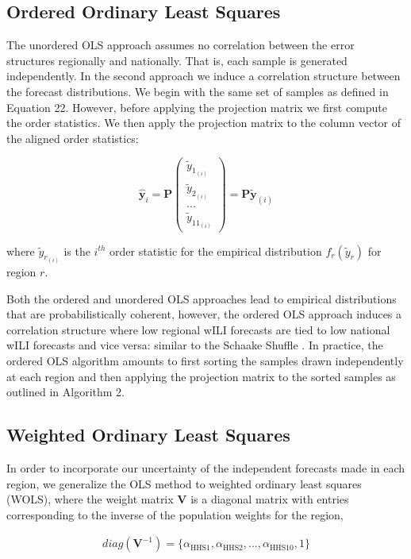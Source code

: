 \documentclass{umassthesis}          %
\begin{document}
\subsection{Ordered Ordinary Least Squares}

The unordered OLS approach assumes no correlation between the error structures regionally and nationally. That is, each sample is generated independently. In the second approach we induce a correlation structure between the forecast distributions. We begin with the same set of samples as defined in Equation 22. However, before applying the projection matrix we first compute the order statistics.  We then apply the projection matrix to the column vector of the aligned order statistics:

$$\bm{\hat{y}}_{i}=\bm{P} \begin{pmatrix} \tilde{y}_{1_{(i)}} \\  \tilde{y}_{2_{(i)}} \\ ... \\  \tilde{y}_{11_{(i)}} \end{pmatrix} = \bm{P} \bm{\tilde{y}}_{(i)}$$

\noindent where $\tilde{y}_{r_{(i)}} $ is the $i^{th}$ order statistic for the empirical distribution $f_r(\tilde{y}_{r})$ for region $r$.

Both the ordered and unordered OLS approaches lead to empirical distributions that are probabilistically coherent, however, the ordered OLS approach induces a correlation structure where low regional wILI forecasts  are tied to low national wILI forecasts and vice versa: similar to the Schaake Shuffle \cite{scheffe}. In practice, the ordered OLS algorithm amounts to first sorting the samples drawn independently at each region and then applying the projection matrix to the sorted samples as outlined in Algorithm 2.



\subsection{ Weighted Ordinary Least Squares}

In order to incorporate our uncertainty of the independent forecasts made in each region, we generalize the OLS method to weighted ordinary least squares (WOLS), where the weight matrix $\bm{V}$ is a diagonal matrix with entries corresponding to the inverse of the population weights for the region,

\begin{align}
diag(\bm{V}^{-1}) =\{\alpha_{\text{HHS}1},\alpha_{\text{HHS}2},...,\alpha_{\text{HHS}10},1 \}
\end{align} 
\end{document}
